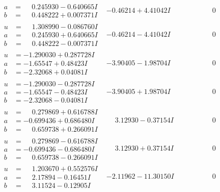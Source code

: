 \documentclass[1p]{elsarticle_modified}
\theoremstyle{definition}
\begin{document}
$$\begin{array}{c|c|c}
\begin{aligned}
a &= \phantom{-}0.245930 - 0.640665 I \\
b &= \phantom{-}0.448222 + 0.007371 I\end{aligned}
 & -0.46214 + 4.41042 I & \phantom{-0.000000 } 0 \\ \hline\begin{aligned}
u &= \phantom{-}1.308990 - 0.086760 I \\
a &= \phantom{-}0.245930 + 0.640665 I \\
b &= \phantom{-}0.448222 - 0.007371 I\end{aligned}
 & -0.46214 - 4.41042 I & \phantom{-0.000000 } 0 \\ \hline\begin{aligned}
u &= -1.290030 + 0.287728 I \\
a &= -1.65547 + 0.48423 I \\
b &= -2.32068 + 0.04081 I\end{aligned}
 & -3.90405 - 1.98704 I & \phantom{-0.000000 } 0 \\ \hline\begin{aligned}
u &= -1.290030 - 0.287728 I \\
a &= -1.65547 - 0.48423 I \\
b &= -2.32068 - 0.04081 I\end{aligned}
 & -3.90405 + 1.98704 I & \phantom{-0.000000 } 0 \\ \hline\begin{aligned}
u &= \phantom{-}0.279869 + 0.616788 I \\
a &= -0.699436 + 0.686480 I \\
b &= \phantom{-}0.659738 + 0.266091 I\end{aligned}
 & \phantom{-}3.12930 - 0.37154 I & \phantom{-0.000000 } 0 \\ \hline\begin{aligned}
u &= \phantom{-}0.279869 - 0.616788 I \\
a &= -0.699436 - 0.686480 I \\
b &= \phantom{-}0.659738 - 0.266091 I\end{aligned}
 & \phantom{-}3.12930 + 0.37154 I & \phantom{-0.000000 } 0 \\ \hline\begin{aligned}
u &= \phantom{-}1.203670 + 0.552576 I \\
a &= \phantom{-}2.17894 - 0.16451 I \\
b &= \phantom{-}3.11524 - 0.12905 I\end{aligned}
 & -2.11962 - 11.30150 I & \phantom{-0.000000 } 0 \\ \hline\begin{aligned}

\end{aligned}
\end{array}$$
\end{document}
